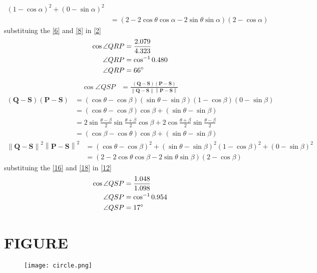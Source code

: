 \documentclass[12pt]{article}
\providecommand{\brak}[1]{\ensuremath{\left(#1\right)}}
\providecommand{\norm}[1]{\left\lVert#1\right\rVert}
\let\vec\mathbf
\begin{document}
\begin{enumerate}
\begin{align}
	\brak{1-\cos\alpha}^2+\brak{0-\sin\alpha}^2\\
	&=\brak{2-2\cos\theta\cos\alpha-2\sin\theta\sin\alpha}\brak{2-\cos\alpha}\label{8}
\end{align}
substituing the \eqref{6} and \eqref{8} in \eqref{2}
\begin{align}
\cos\angle QRP&=\frac{2.079}{4.323}\\
\angle QRP&=\cos^{-1}0.480\\
\angle QRP&=66\degree
\end{align}
\begin{align}
\cos\angle QSP&= \frac{\brak{\vec{Q}-\vec{S}}\brak{\vec{P}-\vec{S}}}{\norm{\vec{Q}-\vec{S}}\norm{\vec{P}-\vec{S}}}\label{12}
\end{align}
\begin{align}
\brak{\vec{Q}-\vec{S}}\brak{\vec{P}-\vec{S}}&= \brak{\cos\theta-\cos\beta}\brak{\sin\theta-\sin\beta}\brak{1-\cos\beta}\brak{0-\sin\beta}\\
&=\brak{\cos\theta-\cos\beta}\cos\beta+\brak{\sin\theta-\sin\beta}\\
&=2\sin\frac{\theta-\beta}{2}\sin\frac{\theta+\beta}{2}\cos\beta+2\cos\frac{\theta+\beta}{2}\sin\frac{\theta-\beta}{2}\\
&=\brak{\cos\beta-\cos\theta}\cos\beta+\brak{\sin\theta-\sin\beta}\label{16}
\end{align}
\begin{align}
\norm{\vec{Q}-\vec{S}}^2\norm{\vec{P}-\vec{S}}^2 &= \brak{\cos\theta-\cos\beta}^2+\brak{\sin\theta-\sin\beta}^2
	\brak{1-\cos\beta}^2+\brak{0-\sin\beta}^2\\
	&=\brak{2-2\cos\theta\cos\beta-2\sin\theta\sin\beta}\brak{2-\cos\beta}\label{18}
\end{align}
substituing the \eqref{16} and \eqref{18} in \eqref{12}
\begin{align}
\cos\angle QSP&=\frac{1.048}{1.098}\\
\angle QSP&=\cos^{-1}0.954\\
\angle QSP&=17\degree
\end{align}
\section{FIGURE}
\begin{figure}[h]
\centering
\texttt{[image: circle.png]}
\caption{}
		\label{fig:Figure}
\end{figure}
\end{enumerate}
\end{document}
